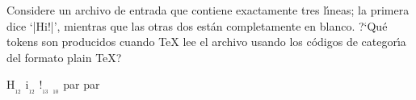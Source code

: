 

\bigskip

\enunciadoS Considere un archivo de entrada que contiene exactamente
tres l\'{\i}neas; la primera dice `|Hi!|', mientras que las otras dos
est\'an completamente en blanco. ?`Qu\'e tokens son producidos cuando
{\TeX} lee el archivo usando los c\'odigos de categor\'{\i}a del
formato plain {\TeX}?

\bigskip

\respuestaS H$_{_{12}}$ i$_{_{12}}$ !$_{_{13}}$
\literalblanco$_{_{10}}$ par par

\bye


